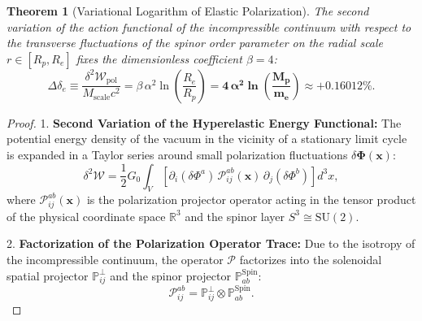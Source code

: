 \documentclass[12pt,a4paper]{article}
\newtheorem{theorem}{Theorem}
\begin{document}
	\begin{theorem}[Variational Logarithm of Elastic Polarization]
	The second variation of the action functional of the incompressible continuum with respect to the transverse fluctuations of the spinor order parameter on the radial scale $r \in [R_p, R_e]$ fixes the dimensionless coefficient $\beta = 4$:
	\begin{equation}
	\Delta \delta_e \equiv \frac{\delta^2 \mathcal{W}_{\mathrm{pol}}}{M_{\mathrm{scale}} c^2} = \beta \, \alpha^2 \ln\left( \frac{R_e}{R_p} \right) = \mathbf{4 \, \alpha^2 \ln\left( \frac{M_p}{m_e} \right)} \approx \mathbf{+0.16012\%}.
	\end{equation}
	\end{theorem}
		
	\begin{proof}
	1. \textbf{Second Variation of the Hyperelastic Energy Functional:}
	The potential energy density of the vacuum in the vicinity of a stationary limit cycle is expanded in a Taylor series around small polarization fluctuations $\delta \boldsymbol{\Phi}(\mathbf{x})$:
	\begin{equation}
	\delta^2 \mathcal{W} = \frac{1}{2} G_0 \int_{V} \left[ \partial_i (\delta \Phi^a) \, \mathcal{P}_{ij}^{ab}(\mathbf{x}) \, \partial_j (\delta \Phi^b) \right] d^3x,
	\end{equation}
	where $\mathcal{P}_{ij}^{ab}(\mathbf{x})$ is the polarization projector operator acting in the tensor product of the physical coordinate space $\mathbb{R}^3$ and the spinor layer $S^3 \cong \mathrm{SU}(2)$.
				
	2. \textbf{Factorization of the Polarization Operator Trace:}
	Due to the isotropy of the incompressible continuum, the operator $\mathcal{P}$ factorizes into the solenoidal spatial projector $\mathbb{P}^\perp_{ij}$ and the spinor projector $\mathbb{P}^{\mathrm{Spin}}_{ab}$:
	\begin{equation}
	\mathcal{P}_{ij}^{ab} = \mathbb{P}^\perp_{ij} \otimes \mathbb{P}^{\mathrm{Spin}}_{ab}.
	\end{equation}
				

\end{proof}
\end{document}
